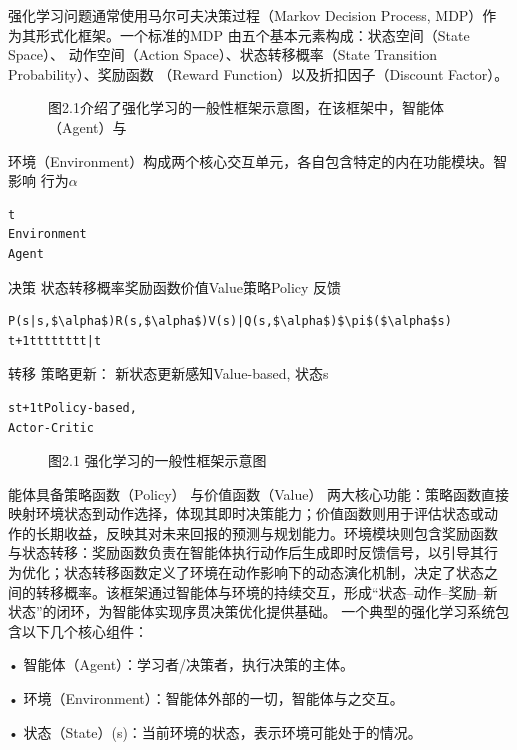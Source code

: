 \documentclass[12pt,a4paper,openright,UTF8]{ctexbook}
\begin{document}
强化学习问题通常使用马尔可夫决策过程（Markov Decision Process, MDP）作 为其形式化框架。一个标准的MDP 由五个基本元素构成：状态空间（State Space）、 动作空间（Action Space）、状态转移概率（State Transition Probability）、奖励函数 （Reward Function）以及折扣因子（Discount Factor）。

\begin{figure}[htbp]
\centering
{}
\caption{图2.1介绍了强化学习的一般性框架示意图，在该框架中，智能体（Agent）与}
\end{figure}

环境（Environment）构成两个核心交互单元，各自包含特定的内在功能模块。智 影响 行为$\alpha$

\begin{lstlisting}
t
Environment
Agent
\end{lstlisting}
决策 状态转移概率奖励函数价值Value策略Policy 反馈

\begin{lstlisting}
P(s|s,$\alpha$)R(s,$\alpha$)V(s)|Q(s,$\alpha$)$\pi$($\alpha$s)
t+1tttttttt|t
\end{lstlisting}
转移 策略更新： 新状态更新感知Value-based, 状态s

\begin{lstlisting}
st+1tPolicy-based,
Actor-Critic
\end{lstlisting}

\begin{figure}[htbp]
\centering
{}
\caption{图2.1 强化学习的一般性框架示意图}
\end{figure}

能体具备策略函数（Policy） 与价值函数（Value） 两大核心功能：策略函数直接 映射环境状态到动作选择，体现其即时决策能力；价值函数则用于评估状态或动 作的长期收益，反映其对未来回报的预测与规划能力。环境模块则包含奖励函数 与状态转移：奖励函数负责在智能体执行动作后生成即时反馈信号，以引导其行 为优化；状态转移函数定义了环境在动作影响下的动态演化机制，决定了状态之 间的转移概率。该框架通过智能体与环境的持续交互，形成“状态–动作–奖励–新 状态”的闭环，为智能体实现序贯决策优化提供基础。 一个典型的强化学习系统包含以下几个核心组件：

• 智能体（Agent）：学习者/决策者，执行决策的主体。

• 环境（Environment）：智能体外部的一切，智能体与之交互。

• 状态（State）(s)：当前环境的状态，表示环境可能处于的情况。
\end{document}
